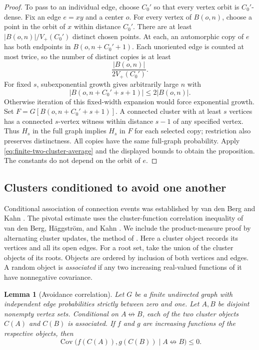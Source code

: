 \documentclass[11pt]{article}
\newtheorem{lemma}[theorem]{Lemma}
\theoremstyle{definition}
\begin{document}
\begin{proof}
To pass to an individual edge, choose $C_0'$ so that every vertex orbit
is $C_0'$-dense. Fix an edge $e=xy$ and a center $o$. For every vertex
of $B(o,n)$, choose a point in the orbit of $x$ within distance $C_0'$.
There are at least $|B(o,n)|/V_+(C_0')$ distinct chosen points. At each,
an automorphic copy of $e$ has both endpoints in $B(o,n+C_0'+1)$.
Each unoriented edge is counted at most twice, so the number of distinct
copies is at least
\[
 \frac{|B(o,n)|}{2V_+(C_0')}.
\]
For fixed $s$, subexponential growth gives arbitrarily large $n$ with
\[
 |B(o,n+C_0'+s+1)|\le2|B(o,n)|.
\]
Otherwise iteration of this fixed-width expansion would force
exponential growth. Set $F=G[B(o,n+C_0'+s+1)]$. A connected cluster
with at least $s$ vertices has a connected $s$-vertex witness within
distance $s-1$ of any specified vertex. Thus $H_s$ in the full graph
implies $H_s$ in $F$ for each selected copy; restriction also preserves
distinctness. All copies have the same full-graph probability.
Apply \eqref{eq:finite-two-cluster-average} and the displayed bounds
to obtain the proposition. The constants do not depend on the orbit
of $e$.
\end{proof}

\subsection{Clusters conditioned to avoid one another}

Conditional association of connection events was established by
van den Berg and Kahn \cite{VanDenBergKahn2001}.
The pivotal estimate uses the cluster-function correlation inequality of
van den Berg, H\"aggstr\"om, and Kahn
\cite[Theorems~1.3 and~1.4]{VanDenBergHaggstromKahn2006}. We include the
product-measure proof by alternating cluster updates, the method of
\cite[Section~2.1]{VanDenBergHaggstromKahn2006}.
Here a cluster object records its vertices and all its open edges.
For a root set, take the union of the cluster objects of its roots.
Objects are ordered by inclusion of both vertices and edges.
A random object is \emph{associated} if any two increasing real-valued
functions of it have nonnegative covariance.

\begin{lemma}[Avoidance correlation]\label{lem:avoidance}
Let $G$ be a finite undirected graph with independent edge probabilities
strictly between zero and one. Let $A,B$ be disjoint nonempty vertex
sets. Conditional on $A\not\leftrightarrow B$, each of the two cluster
objects $C(A)$ and $C(B)$ is associated. If $f$ and $g$ are increasing
functions of the respective objects, then
\[
 \operatorname{Cov}\bigl(f(C(A)),g(C(B))\mid A\not\leftrightarrow B\bigr)\le0.
\]
\end{lemma}
\end{document}

